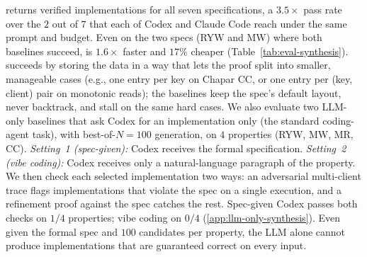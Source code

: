 \sys{} returns verified implementations for all seven specifications, a $3.5\times$ pass rate over the $2$ out of $7$ that each of Codex and Claude Code reach under the same prompt and budget. Even on the two specs (RYW and MW) where both baselines succeed, \sys{} is $1.6\times$ faster and $17\%$ cheaper (Table~\ref{tab:eval-synthesis}).
\sys{} succeeds by storing the data in a way that lets the proof split into smaller, manageable cases (e.g., one entry per key on Chapar CC, or one entry per (key, client) pair on monotonic reads); the baselines keep the spec's default layout, never backtrack, and stall on the same hard cases. We also evaluate two LLM-only baselines that ask Codex for an implementation only (the standard coding-agent task), with best-of-$N{=}100$ generation, on $4$ properties (RYW, MW, MR, CC). \emph{Setting~1 (spec-given):} Codex receives the formal \coq{} specification. \emph{Setting~2 (vibe coding):} Codex receives only a natural-language paragraph of the property. We then check each selected implementation two ways: an adversarial multi-client trace flags implementations that violate the spec on a single execution, and a refinement proof against the spec catches the rest. Spec-given Codex passes both checks on $1/4$ properties; vibe coding on $0/4$ (\cref{app:llm-only-synthesis}). Even given the formal spec and $100$ candidates per property, the LLM alone cannot produce implementations that are guaranteed correct on every input.



